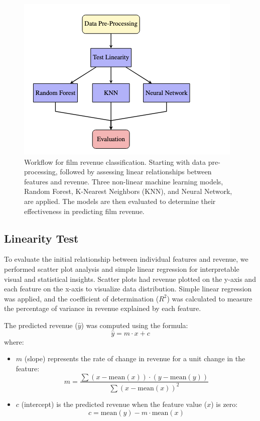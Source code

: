 \documentclass{article}
\begin{document}
\begin{figure}[H]
    \centering
    \vspace{0.3cm} %
    \includegraphics[width=1\linewidth]{pipeline.png} %
    \caption{Workflow for film revenue classification. Starting with data pre-processing, followed by assessing linear relationships between features and revenue. Three non-linear machine learning models, Random Forest, K-Nearest Neighbors (KNN), and Neural Network, are applied. The models are then evaluated to determine their effectiveness in predicting film revenue.}
    \label{fig:film_revenue_pipeline}
\end{figure}

\subsection{Linearity Test}
To evaluate the initial relationship between individual features and revenue, we performed scatter plot analysis and simple linear regression for interpretable visual and statistical insights. Scatter plots had revenue plotted on the y-axis and each feature on the x-axis to visualize data distribution. Simple linear regression was applied, and the coefficient of determination (\( R^2 \)) was calculated to measure the percentage of variance in revenue explained by each feature.

The predicted revenue (\( \hat{y} \)) was computed using the formula:\[\hat{y} = m \cdot x + c\]
where:
\begin{itemize}
    \item \( m \) (slope) represents the rate of change in revenue for a unit change in the feature:
    \[ m = \frac{\sum{(x - \text{mean}(x)) \cdot (y - \text{mean}(y))}}{\sum{(x - \text{mean}(x))^2}}\]
    \item \( c \) (intercept) is the predicted revenue when the feature value (\( x \)) is zero:\[c = \text{mean}(y) - m \cdot \text{mean}(x)\]
\end{itemize}
\end{document}

